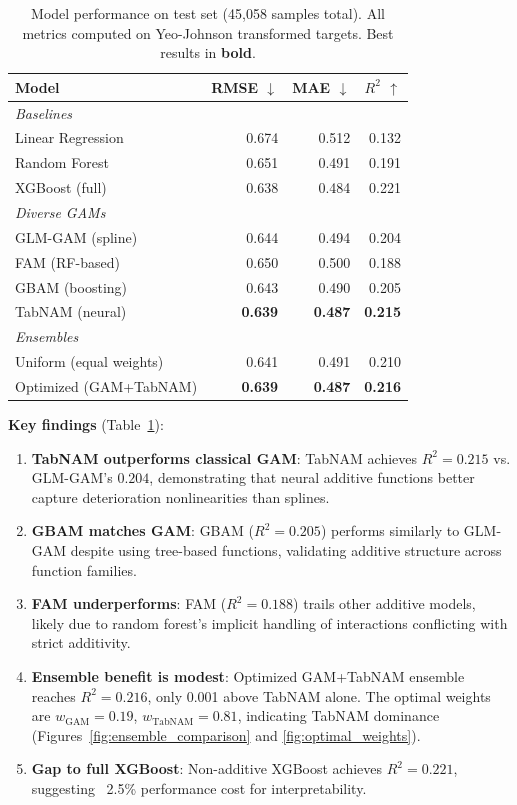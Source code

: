 \documentclass[twocolumn]{article}
\begin{document}
\begin{table}[t]
\centering
\caption{Model performance on test set (45,058 samples total). All metrics computed on Yeo-Johnson transformed targets. Best results in \textbf{bold}.}
\label{tab:results}
\small
\begin{tabular}{lrrr}
\toprule
\textbf{Model} & \textbf{RMSE} $\downarrow$ & \textbf{MAE} $\downarrow$ & \textbf{$R^2$} $\uparrow$ \\
\midrule
\multicolumn{4}{l}{\textit{Baselines}} \\
Linear Regression & 0.674 & 0.512 & 0.132 \\
Random Forest & 0.651 & 0.491 & 0.191 \\
XGBoost (full) & 0.638 & 0.484 & 0.221 \\
\midrule
\multicolumn{4}{l}{\textit{Diverse GAMs}} \\
GLM-GAM (spline) & 0.644 & 0.494 & 0.204 \\
FAM (RF-based) & 0.650 & 0.500 & 0.188 \\
GBAM (boosting) & 0.643 & 0.490 & 0.205 \\
TabNAM (neural) & \textbf{0.639} & \textbf{0.487} & \textbf{0.215} \\
\midrule
\multicolumn{4}{l}{\textit{Ensembles}} \\
Uniform (equal weights) & 0.641 & 0.491 & 0.210 \\
Optimized (GAM+TabNAM) & \textbf{0.639} & \textbf{0.487} & \textbf{0.216} \\
\bottomrule
\end{tabular}
\end{table}

\textbf{Key findings} (Table~\ref{tab:results}):

\begin{enumerate}
\item \textbf{TabNAM outperforms classical GAM}: TabNAM achieves $R^2=0.215$ vs. GLM-GAM's $0.204$, demonstrating that neural additive functions better capture deterioration nonlinearities than splines.

\item \textbf{GBAM matches GAM}: GBAM ($R^2=0.205$) performs similarly to GLM-GAM despite using tree-based functions, validating additive structure across function families.

\item \textbf{FAM underperforms}: FAM ($R^2=0.188$) trails other additive models, likely due to random forest's implicit handling of interactions conflicting with strict additivity.

\item \textbf{Ensemble benefit is modest}: Optimized GAM+TabNAM ensemble reaches $R^2=0.216$, only 0.001 above TabNAM alone. The optimal weights are $w_{\text{GAM}}=0.19$, $w_{\text{TabNAM}}=0.81$, indicating TabNAM dominance (Figures~\ref{fig:ensemble_comparison} and \ref{fig:optimal_weights}).

\item \textbf{Gap to full XGBoost}: Non-additive XGBoost achieves $R^2=0.221$, suggesting ~2.5\% performance cost for interpretability.
\end{enumerate}
\end{document}
